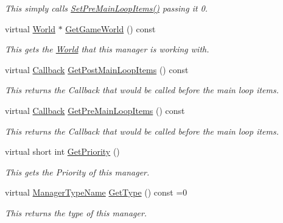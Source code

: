 \begin{DoxyCompactItemize}
\begin{DoxyCompactList}\small\item\em This simply calls \hyperlink{classphys_1_1ManagerBase_a3fcf207a451d0047f884babadd0bc53e}{SetPreMainLoopItems()} passing it 0. \item\end{DoxyCompactList}\item 
virtual \hyperlink{classphys_1_1World}{World} $\ast$ \hyperlink{classphys_1_1ManagerBase_addfd62fbc444ca4c2aba40768d1b284e}{GetGameWorld} () const 
\begin{DoxyCompactList}\small\item\em This gets the \hyperlink{classphys_1_1World}{World} that this manager is working with. \item\end{DoxyCompactList}\item 
virtual \hyperlink{classphys_1_1ManagerBase_a753f5f0127131529767beab2502f480b}{Callback} \hyperlink{classphys_1_1ManagerBase_a1e541b261e5747ebcfcefdd3dcff78ce}{GetPostMainLoopItems} () const 
\begin{DoxyCompactList}\small\item\em This returns the Callback that would be called before the main loop items. \item\end{DoxyCompactList}\item 
virtual \hyperlink{classphys_1_1ManagerBase_a753f5f0127131529767beab2502f480b}{Callback} \hyperlink{classphys_1_1ManagerBase_a02a92b0d5df8b8b877822bdf57ec8ffc}{GetPreMainLoopItems} () const 
\begin{DoxyCompactList}\small\item\em This returns the Callback that would be called before the main loop items. \item\end{DoxyCompactList}\item 
virtual short int \hyperlink{classphys_1_1ManagerBase_af1798db3b808a658bdf14d8914d9b91d}{GetPriority} ()
\begin{DoxyCompactList}\small\item\em This gets the Priority of this manager. \item\end{DoxyCompactList}\item 
virtual \hyperlink{classphys_1_1ManagerBase_aaa6ccddf23892eaccb898529414f80a5}{ManagerTypeName} \hyperlink{classphys_1_1ManagerBase_aff400b6599db635e24796d8221e9a0e3}{GetType} () const =0
\begin{DoxyCompactList}\small\item\em This returns the type of this manager. \item\end{DoxyCompactList}\item 

\end{DoxyCompactItemize}
